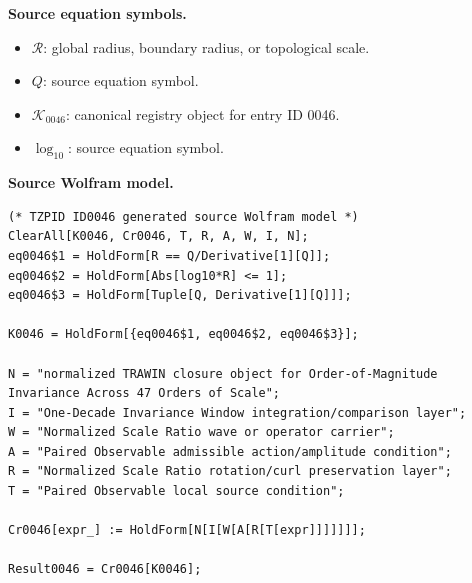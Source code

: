 \begin{minipage}[t]{0.49\linewidth}
\begingroup
\small
\raggedright
\textbf{Source equation symbols.}\par
\begin{itemize}[leftmargin=1.35em,itemsep=1pt,topsep=1pt,parsep=0pt]
    \item $\mathcal{R}$: global radius, boundary radius, or topological scale.
    \item $Q$: source equation symbol.
    \item $\mathcal{K}_{0046}$: canonical registry object for entry ID 0046.
    \item $\log_{10}$: source equation symbol.
\end{itemize}
\endgroup
\end{minipage}\hfill
\begin{minipage}[t]{0.47\linewidth}
\begingroup
\scriptsize
\raggedright
\textbf{Source Wolfram model.}\par
\begin{Verbatim}[fontsize=\tiny,breaklines=true,breakanywhere=true]
(* TZPID ID0046 generated source Wolfram model *)
ClearAll[K0046, Cr0046, T, R, A, W, I, N];
eq0046$1 = HoldForm[R == Q/Derivative[1][Q]];
eq0046$2 = HoldForm[Abs[log10*R] <= 1];
eq0046$3 = HoldForm[Tuple[Q, Derivative[1][Q]]];

K0046 = HoldForm[{eq0046$1, eq0046$2, eq0046$3}];

N = "normalized TRAWIN closure object for Order-of-Magnitude Invariance Across 47 Orders of Scale";
I = "One-Decade Invariance Window integration/comparison layer";
W = "Normalized Scale Ratio wave or operator carrier";
A = "Paired Observable admissible action/amplitude condition";
R = "Normalized Scale Ratio rotation/curl preservation layer";
T = "Paired Observable local source condition";

Cr0046[expr_] := HoldForm[N[I[W[A[R[T[expr]]]]]]];

Result0046 = Cr0046[K0046];
\end{Verbatim}
\endgroup
\end{minipage}

